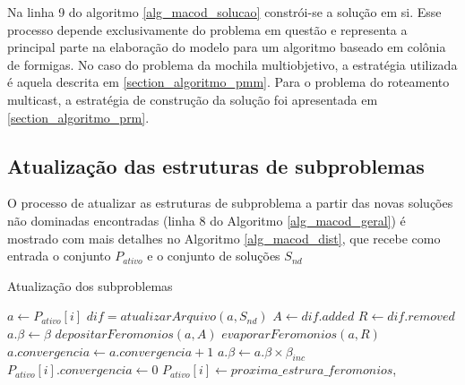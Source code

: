 Na linha 9 do algoritmo \ref{alg_macod_solucao} constrói-se a solução em si. Esse processo depende exclusivamente do problema em questão e representa a principal parte na elaboração do modelo para um algoritmo baseado em colônia de formigas. No caso do problema da mochila multiobjetivo, a estratégia utilizada é aquela descrita em \ref{section_algoritmo_pmm}. Para o problema do roteamento multicast, a estratégia de construção da solução foi apresentada em \ref{section_algoritmo_prm}.

\subsection{Atualização das estruturas de subproblemas}

O processo de atualizar as estruturas de subproblema a partir das novas soluções não dominadas encontradas (linha 8 do Algoritmo \ref{alg_macod_geral}) é mostrado com mais detalhes no Algoritmo \ref{alg_macod_dist}, que recebe como entrada o conjunto $P_{ativo}$ e o conjunto de soluções $S_{nd}$

\begin{algorithm}[!htbp]
	\caption{Atualização dos subproblemas}
	\label{alg_macod_dist}
	\begin{algorithmic}[1]
		\State $a \gets P_{ativo}[i]$
		\State $dif = atualizarArquivo(a, S_{nd})$
		\State $A \gets dif.added$
		\State $R \gets dif.removed$
		\State $a.\beta \gets \beta$
		\State $depositarFeromonios(a, A)$
		\State $evaporarFeromonios(a, R)$
		\Else
		\State $a.convergencia \gets a.convergencia + 1$
		\State $a.\beta \gets a.\beta \times \beta_{inc}$
		\State $P_{ativo}[i].convergencia \gets 0$
		\State $P_{ativo}[i] \gets proxima\_estrura\_feromonios$,
		\EndIf
		\EndIf
		\EndFor
	\end{algorithmic}
\end{algorithm}

